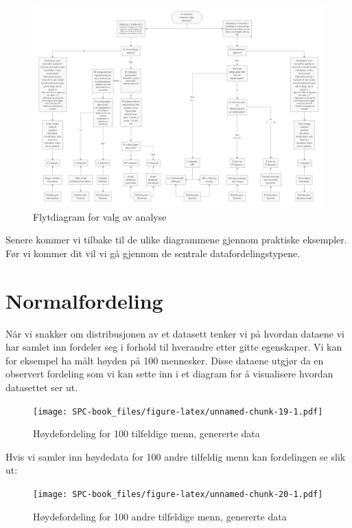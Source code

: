 \documentclass[
]{book}
\begin{document}
\begin{figure}
\centering
\includegraphics{Flytdiagram_valg.png}
\caption{Flytdiagram for valg av analyse}
\end{figure}

Senere kommer vi tilbake til de ulike diagrammene gjennom praktiske eksempler. Før vi kommer dit vil vi gå gjennom de sentrale datafordelingstypene.

\hypertarget{normalfordeling}{%
\section{Normalfordeling}\label{normalfordeling}}

Når vi snakker om distribusjonen av et datasett tenker vi på hvordan dataene vi har samlet inn fordeler seg i forhold til hverandre etter gitte egenskaper. Vi kan for eksempel ha målt høyden på 100 mennesker. Disse dataene utgjør da en observert fordeling som vi kan sette inn i et diagram for å visualisere hvordan datasettet ser ut.

\begin{figure}
\centering
\texttt{[image: SPC-book\_files/figure-latex/unnamed-chunk-19-1.pdf]}
\caption{\label{fig:unnamed-chunk-19}Høydefordeling for 100 tilfeldige menn, genererte data}
\end{figure}

Hvis vi samler inn høydedata for 100 andre tilfeldig menn kan fordelingen se slik ut:

\begin{figure}
\centering
\texttt{[image: SPC-book\_files/figure-latex/unnamed-chunk-20-1.pdf]}
\caption{\label{fig:unnamed-chunk-20}Høydefordeling for 100 andre tilfeldige menn, genererte data}
\end{figure}
\end{document}
